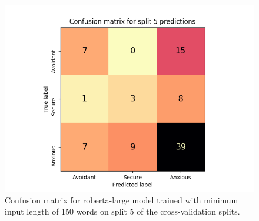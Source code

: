 \documentclass[12pt]{report}
\begin{document}
\begin{figure}
    \includegraphics[width=\textwidth]{figures/roberta-large_150_split5_confusion_matrix.png}
    \caption{Confusion matrix for roberta-large model trained with minimum input length of 150 words on split 5 of the cross-validation splits.}
    \label{fig: cm split5}
\end{figure}
\end{document}

